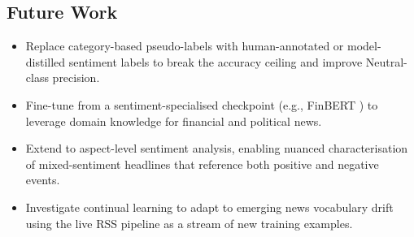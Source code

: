\documentclass[conference]{IEEEtran}
\begin{document}
\subsection*{Future Work}
\begin{itemize}
  \item Replace category-based pseudo-labels with human-annotated or
        model-distilled sentiment labels to break the accuracy ceiling
        and improve Neutral-class precision.
  \item Fine-tune from a sentiment-specialised checkpoint
        (e.g., FinBERT \cite{araci2019finbert}) to leverage domain
        knowledge for financial and political news.
  \item Extend to aspect-level sentiment analysis, enabling nuanced
        characterisation of mixed-sentiment headlines that reference
        both positive and negative events.
  \item Investigate continual learning to adapt to emerging news
        vocabulary drift using the live RSS pipeline as a stream of
        new training examples.
\end{itemize}
\end{document}
